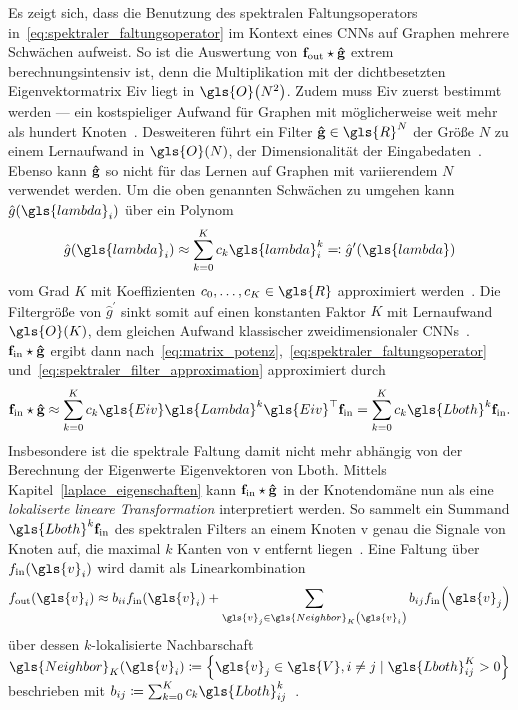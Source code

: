 Es zeigt sich, dass die Benutzung des spektralen Faltungsoperators in~\eqref{eq:spektraler_faltungsoperator} im Kontext eines \glspl{CNN} auf Graphen mehrere Schwächen aufweist.
So ist \zB{} die Auswertung von $\mathbf{f}_{\mathrm{out}} \star \mathbf{\hat g}$ extrem berechnungsintensiv ist, denn die Multiplikation mit der dichtbesetzten Eigenvektormatrix \gls{Eiv} liegt in $\gls{O}\left(N^2\right)$.
Zudem muss \gls{Eiv} zuerst bestimmt werden — ein kostspieliger Aufwand für Graphen mit möglicherweise weit mehr als hundert Knoten~\cite{gcn}.
Desweiteren führt ein Filter $\ve{\hat g} \in \gls{R}^N$ der Größe $N$ zu einem Lernaufwand in $\gls{O}\left(N\right)$, \dhe{} der Dimensionalität der Eingabedaten~\cite{Defferrard}.
Ebenso kann $\mathbf{\hat g}$ so nicht für das Lernen auf Graphen mit variierendem $N$ verwendet werden.
Um die oben genannten Schwächen zu umgehen kann $\hat g\left(\gls{lambda}_i\right)$ über ein Polynom\begin{equation}
  \hat g\left(\gls{lambda}_i\right) \approx \sum_{k=0}^K c_k\gls{lambda}_i^k \eqqcolon \hat g^{\prime}\left(\gls{lambda}\right)
  \label{eq:spektraler_filter_approximation}
\end{equation}
vom Grad $K$ mit Koeffizienten $c_0, \ldots, c_K \in \gls{R}$ approximiert werden~\cite{Hammond, Defferrard}.
Die Filtergröße von $\hat g^{\prime}$ sinkt somit auf einen konstanten Faktor $K$ mit Lernaufwand $\gls{O}\left(K\right)$, dem gleichen Aufwand klassischer zweidimensionaler \glspl{CNN}~\cite{Defferrard}.
$\mathbf{f}_{\mathrm{in}} \star \mathbf{\hat g}$ ergibt dann nach~\eqref{eq:matrix_potenz},~\eqref{eq:spektraler_faltungsoperator} und~\eqref{eq:spektraler_filter_approximation} approximiert durch~\cite{Defferrard}
\begin{equation}
  \ve{f}_{\mathrm{in}} \star \ve{\hat g} \approx \sum_{k=0}^K c_k\gls{Eiv}\gls{Lambda}^k\gls{Eiv}^{\top}\ve{f}_{\mathrm{in}} = \sum_{k=0}^K c_k \gls{Lboth}^k \ve{f}_{\mathrm{in}}.
  \label{eq:spektraler_faltungsoperator_approximation}
\end{equation}
Insbesondere ist die spektrale Faltung damit nicht mehr abhängig von der Berechnung der Eigenwerte \bzw{} Eigenvektoren von \gls{Lboth}.
Mittels Kapitel~\ref{laplace_eigenschaften} kann $\mathbf{f}_{\mathrm{in}} \star \mathbf{\hat g}$ in der Knotendomäne nun als eine \emph{lokaliserte lineare Transformation} interpretiert werden.
So sammelt ein Summand $\gls{Lboth}^k\ve{f}_{\mathrm{in}}$ des spektralen Filters an einem Knoten \gls{v} genau die Signale von Knoten auf, die maximal $k$ Kanten von \gls{v} entfernt liegen~\cite{Hammond}.
Eine Faltung über $f_{\mathrm{in}}\left(\gls{v}_i\right)$ wird damit als Linearkombination
\begin{equation*}
  f_{\mathrm{out}}\left(\gls{v}_i\right) \approx b_{ii} f_{\mathrm{in}}\left(\gls{v}_i\right) + \sum_{\gls{v}_j \in \gls{Neighbor}_K\left(\gls{v}_i\right)} b_{ij} f_{\mathrm{in}}\left(\gls{v}_j\right)
\end{equation*}
über dessen $k$-lokalisierte Nachbarschaft $\gls{Neighbor}_K\left(\gls{v}_i\right) \coloneqq \left\{ \gls{v}_j \in \gls{V}, i \neq j \mid \gls{Lboth}^K_{ij} > 0 \right\}$ beschrieben mit $b_{ij} \coloneqq \sum_{k=0}^K c_k \gls{Lboth}^k_{ij}$~\cite{Shuman}.

